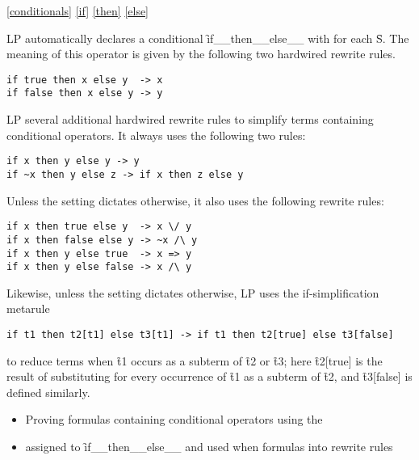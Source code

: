 \ref{conditionals}
\ref{if}
\ref{then}
\ref{else}

LP automatically declares a conditional 
\f{if__then__else__} with   for 
each  \f{S}.  The meaning of this operator is given by the
following two hardwired rewrite rules.
\begin{verbatim}
if true then x else y  -> x
if false then x else y -> y
\end{verbatim}

LP several additional hardwired rewrite rules to simplify terms containing
conditional operators.  It always uses the following two rules:
\begin{verbatim}
if x then y else y -> y
if ~x then y else z -> if x then z else y
\end{verbatim}
Unless the  setting dictates otherwise, it also uses
the following rewrite rules:
\begin{verbatim}
if x then true else y  -> x \/ y
if x then false else y -> ~x /\ y
if x then y else true  -> x => y
if x then y else false -> x /\ y
\end{verbatim}
Likewise, unless the  setting dictates otherwise, LP
uses the if-simplification metarule
\begin{verbatim}
if t1 then t2[t1] else t3[t1] -> if t1 then t2[true] else t3[false]
\end{verbatim}
to reduce terms when \f{t1} occurs as a subterm of \f{t2} or \f{t3}; here
\f{t2[true]} is the result of substituting  for every occurrence of
\f{t1} as a subterm of \f{t2}, and \f{t3[false]} is defined similarly.

\begin{itemize}
\item
Proving formulas containing conditional operators using the 
\item
{} assigned to
\f{if__then__else__} and used when
 formulas into rewrite rules
\end{itemize}

